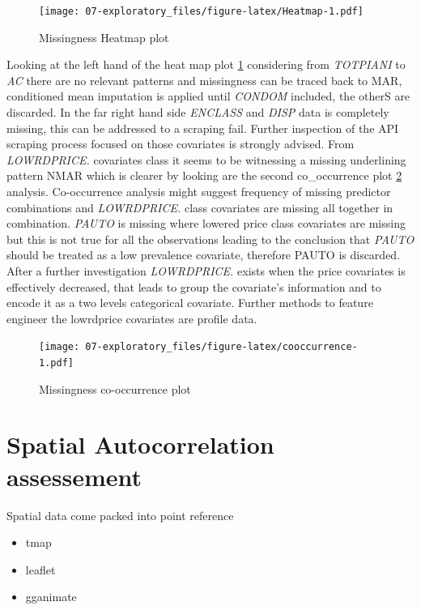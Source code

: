 \documentclass[
  12pt,
  a4paper,
  oneside]{book}
\providecommand{\tightlist}{%
  \setlength{\itemsep}{0pt}\setlength{\parskip}{0pt}}
\theoremstyle{definition}
\theoremstyle{definition}
\theoremstyle{definition}
\theoremstyle{remark}
\begin{document}
\begin{figure}
\centering
\texttt{[image: 07-exploratory\_files/figure-latex/Heatmap-1.pdf]}
\caption{\label{fig:Heatmap}Missingness Heatmap plot}
\end{figure}

Looking at the left hand of the heat map plot \ref{fig:Heatmap} considering from \emph{TOTPIANI} to \emph{AC} there are no relevant patterns and missingness can be traced back to MAR, conditioned mean imputation is applied until \emph{CONDOM} included, the otherS are discarded. In the far right hand side \emph{ENCLASS} and \emph{DISP} data is completely missing, this can be addressed to a scraping fail. Further inspection of the API scraping process focused on those covariates is strongly advised. From \emph{LOWRDPRICE.} covariates class it seems to be witnessing a missing underlining pattern NMAR which is clearer by looking are the second co\_occurrence plot \ref{fig:cooccurrence} analysis. Co-occurrence analysis might suggest frequency of missing predictor combinations and \emph{LOWRDPRICE.} class covariates are missing all together in combination. \emph{PAUTO} is missing where lowered price class covariates are missing but this is not true for all the observations leading to the conclusion that \emph{PAUTO} should be treated as a low prevalence covariate, therefore PAUTO is discarded.
After a further investigation \emph{LOWRDPRICE.} exists when the price covariates is effectively decreased, that leads to group the covariate's information and to encode it as a two levels categorical covariate. Further methods to feature engineer the lowrdprice covariates are profile data.

\begin{figure}
\centering
\texttt{[image: 07-exploratory\_files/figure-latex/cooccurrence-1.pdf]}
\caption{\label{fig:cooccurrence}Missingness co-occurrence plot}
\end{figure}

\hypertarget{spatial-autocorrelation-assessement}{%
\section{Spatial Autocorrelation assessement}\label{spatial-autocorrelation-assessement}}

Spatial data come packed into point reference

\begin{itemize}
\tightlist
\item
  tmap
\item
  leaflet
\item
  gganimate
\end{itemize}
\end{document}
